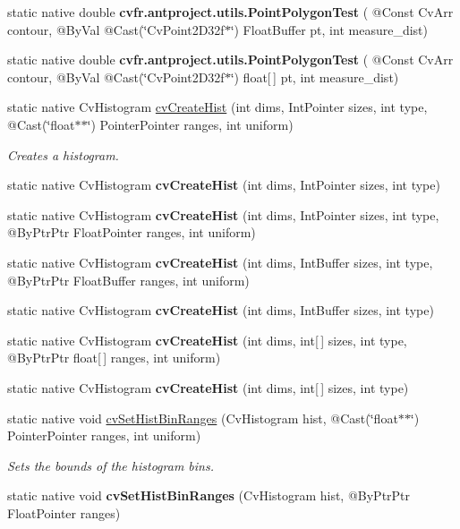 \begin{DoxyCompactItemize}
static native double {\bfseries cv\+fr.antproject.utils.Point\+Polygon\+Test} ( @Const Cv\+Arr contour, @By\+Val @Cast(\char`\"{}Cv\+Point2\+D32f$\ast$\char`\"{}) Float\+Buffer pt, int measure\+\_\+dist)
\item 
static native double {\bfseries cv\+fr.antproject.utils.Point\+Polygon\+Test} ( @Const Cv\+Arr contour, @By\+Val @Cast(\char`\"{}Cv\+Point2\+D32f$\ast$\char`\"{}) float\mbox{[}$\,$\mbox{]} pt, int measure\+\_\+dist)
\item 
static native Cv\+Histogram \hyperlink{group__imgproc__c_ga35e0a34e834d2b6654992a0116be5253}{cv\+Create\+Hist} (int dims, Int\+Pointer sizes, int type, @Cast(\char`\"{}float$\ast$$\ast$\char`\"{}) Pointer\+Pointer ranges, int uniform)
\begin{DoxyCompactList}\small\item\em Creates a histogram. \end{DoxyCompactList}\item 
static native Cv\+Histogram {\bfseries cv\+Create\+Hist} (int dims, Int\+Pointer sizes, int type)
\item 
static native Cv\+Histogram {\bfseries cv\+Create\+Hist} (int dims, Int\+Pointer sizes, int type, @By\+Ptr\+Ptr Float\+Pointer ranges, int uniform)
\item 
static native Cv\+Histogram {\bfseries cv\+Create\+Hist} (int dims, Int\+Buffer sizes, int type, @By\+Ptr\+Ptr Float\+Buffer ranges, int uniform)
\item 
static native Cv\+Histogram {\bfseries cv\+Create\+Hist} (int dims, Int\+Buffer sizes, int type)
\item 
static native Cv\+Histogram {\bfseries cv\+Create\+Hist} (int dims, int\mbox{[}$\,$\mbox{]} sizes, int type, @By\+Ptr\+Ptr float\mbox{[}$\,$\mbox{]} ranges, int uniform)
\item 
static native Cv\+Histogram {\bfseries cv\+Create\+Hist} (int dims, int\mbox{[}$\,$\mbox{]} sizes, int type)
\item 
static native void \hyperlink{group__imgproc__c_ga0e759a50b0655297cb3cb3215bdb0f5b}{cv\+Set\+Hist\+Bin\+Ranges} (Cv\+Histogram hist, @Cast(\char`\"{}float$\ast$$\ast$\char`\"{}) Pointer\+Pointer ranges, int uniform)
\begin{DoxyCompactList}\small\item\em Sets the bounds of the histogram bins. \end{DoxyCompactList}\item 
static native void {\bfseries cv\+Set\+Hist\+Bin\+Ranges} (Cv\+Histogram hist, @By\+Ptr\+Ptr Float\+Pointer ranges)

\end{DoxyCompactItemize}

